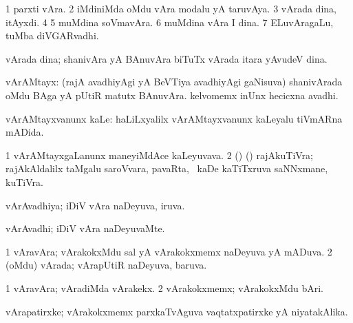 {{\noindent 
\gl{\pagu}
\expl{}
\bmng
\bnum
\num{1}  parxti vAra. 
\num{2}  iMdiniMda oMdu vAra modalu yA taruvAya. 
\num{3}  vArada dina, \udA\  itAyxdi. 
\num{4}  
\num{5}  muMdina soVmavAra. 
\num{6}  muMdina vAra I dina. 
\num{7}  ELuvAragaLu, tuMba diVGARvadhi. 
\enum
\emng
\eentry

\bentry
{} 
\gl{\nA}
\expl{}
\bmng
vArada dina; shanivAra yA BAnuvAra biTuTx vArada itara yAvudeV dina. 
\emng
\eentry

\bentry
{} 
\gl{\nA}
\expl{}
\bmng
vArAMtayx: 
\banum
{} (rajA avadhiyAgi yA BeVTiya avadhiyAgi gaNisuva) shanivArada oMdu BAga yA pUtiR matutx BAnuvAra. 
 kelvomemx inUnx hecicxna avadhi. 
\eanum
\emng
\eentry

\bentry
{} 
\gl{\akirx}
\expl{}
\bmng
vArAMtayxvanunx kaLe:  haLiLxyalilx vArAMtayxvanunx kaLeyalu tiVmARna mADida. 
\emng
\eentry

\bentry
{} 
\gl{\nA}
\expl{}
\bmng
\bnum
\num{1} vArAMtayxgaLanunx maneyiMdAce kaLeyuvava. 
\num{2} (\AseTxrXV) (\AmA) rajAkuTiVra; rajAkAldalilx taMgalu saroVvara, pavaRta, \mo\ kaDe kaTiTxruva saNNxmane, kuTiVra. 
\enum
\emng
\eentry

\bentry
{} 
\gl{\gu}
\expl{}
\bmng
vArAvadhiya; iDiV vAra naDeyuva, iruva. 
\emng
\eentry

\bentry
{} 
\gl{\kirxvi}
\expl{}
\bmng
vArAvadhi; iDiV vAra naDeyuvaMte. 
\emng
\eentry

\bentry
{} 
\gl{\gu}
\expl{}
\bmng
\bnum
\num{1} vAravAra; vArakokxMdu sal yA vArakokxmemx naDeyuva yA mADuva. 
\num{2} (oMdu) vArada; vArapUtiR naDeyuva, baruva. 
\enum
\emng
\eentry

\bentry
{} 
\gl{\kirxvi}
\expl{}
\bmng
\bnum
\num{1} vAravAra; vAradiMda vArakekx. 
\num{2} vArakokxmemx; vArakokxMdu bAri. 
\enum
\emng
\eentry

\bentry
{} 
\gl{\nA}
\bmng
vArapatirxke; vArakokxmemx parxkaTvAguva vaqtatxpatirxke yA niyatakAlika. 
\emng
\eentry

}}
